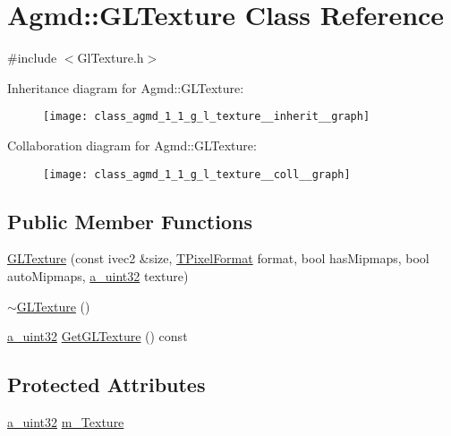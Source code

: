 \hypertarget{class_agmd_1_1_g_l_texture}{\section{Agmd\+:\+:G\+L\+Texture Class Reference}
\label{class_agmd_1_1_g_l_texture}
}


{\ttfamily \#include $<$Gl\+Texture.\+h$>$}



Inheritance diagram for Agmd\+:\+:G\+L\+Texture\+:\nopagebreak
\begin{figure}[H]
\begin{center}
\leavevmode
\texttt{[image: class\_agmd\_1\_1\_g\_l\_texture\_\_inherit\_\_graph]}
\end{center}
\end{figure}


Collaboration diagram for Agmd\+:\+:G\+L\+Texture\+:\nopagebreak
\begin{figure}[H]
\begin{center}
\leavevmode
\texttt{[image: class\_agmd\_1\_1\_g\_l\_texture\_\_coll\_\_graph]}
\end{center}
\end{figure}
\subsection*{Public Member Functions}
\begin{DoxyCompactItemize}
\item 
\hyperlink{class_agmd_1_1_g_l_texture_a94fdd07831e2f2633a78d96e28d48456}{G\+L\+Texture} (const ivec2 \&size, \hyperlink{namespace_agmd_afc48fd9fa5dccb4c5621c052bfd1a7ec}{T\+Pixel\+Format} format, bool has\+Mipmaps, bool auto\+Mipmaps, \hyperlink{_common_defines_8h_a964296f9770051b9e4807b1f180dd416}{a\+\_\+uint32} texture)
\item 
\hyperlink{class_agmd_1_1_g_l_texture_a98f605b018e84cfc63628f10a5cd52f8}{$\sim$\+G\+L\+Texture} ()
\item 
\hyperlink{_common_defines_8h_a964296f9770051b9e4807b1f180dd416}{a\+\_\+uint32} \hyperlink{class_agmd_1_1_g_l_texture_a40df1851489961f3dc4cb8c957edf1ad}{Get\+G\+L\+Texture} () const 
\end{DoxyCompactItemize}
\subsection*{Protected Attributes}
\begin{DoxyCompactItemize}
\item 
\hyperlink{_common_defines_8h_a964296f9770051b9e4807b1f180dd416}{a\+\_\+uint32} \hyperlink{class_agmd_1_1_g_l_texture_af69c322f23124938ee25c929d0661f41}{m\+\_\+\+Texture}
\end{DoxyCompactItemize}
